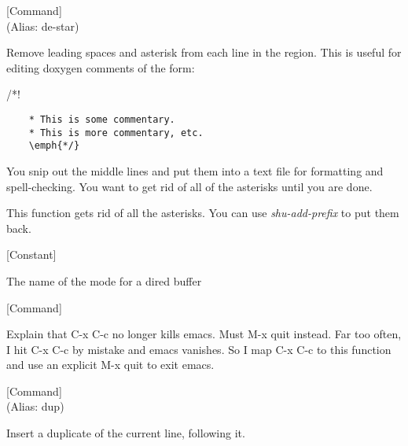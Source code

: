 \vspace{1em}
\noindent
{}
\usebox{\funcname}
 \hfill [Command]\\%
 (Alias: de-star)

\begin{doc-string}
Remove leading spaces and asterisk from each line in the region.  This is
useful for editing doxygen comments of the form:

   /*!
\small{\begin{verbatim}
    * This is some commentary.
    * This is more commentary, etc.
    \emph{*/}
\end{verbatim}}

You snip out the middle lines and put them into a text file for formatting and
spell-checking.  You want to get rid of all of the asterisks until you are
done.

This function gets rid of all the asterisks.  You can use \emph{shu-add-prefix} to
put them back.
\end{doc-string}

\vspace{1em}
\noindent
{}
\usebox{\funcname}
 \hfill [Constant]

\begin{doc-string}
The name of the mode for a dired buffer
\end{doc-string}

\vspace{1em}
\noindent
{}
\usebox{\funcname}
 \hfill [Command]

\begin{doc-string}
Explain that C-x C-c no longer kills emacs.  Must M-x quit instead.
Far too often, I hit C-x C-c by mistake and emacs vanishes.  So I map
C-x C-c to this function and use an explicit M-x quit to exit emacs.
\end{doc-string}

\vspace{1em}
\noindent
{}
\usebox{\funcname}
 \hfill [Command]\\%
 (Alias: dup)

\begin{doc-string}
Insert a duplicate of the current line, following it.
\end{doc-string}

